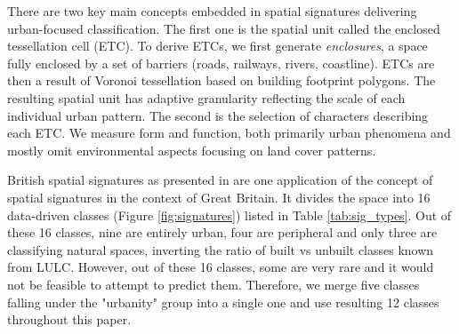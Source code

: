There are two key main concepts embedded in spatial signatures delivering urban-focused
classification. The first one is the spatial unit called the enclosed tessellation cell
(ETC). To derive ETCs, we first generate \textit{enclosures}, a space fully enclosed by
a set of barriers (roads, railways, rivers, coastline). ETCs are then a result of
Voronoi tessellation based on building footprint polygons. The resulting spatial unit
has adaptive granularity reflecting the scale of each individual urban pattern. The
second is the selection of characters describing each ETC. We measure form and function,
both primarily urban phenomena and mostly omit environmental aspects focusing on land
cover patterns.


British spatial signatures as presented in \cite{fleischmann2022geographical} are one
application of the concept of spatial signatures in
the context of Great Britain. It divides the space into 16 data-driven classes
(Figure \ref{fig:signatures}) listed in Table \ref{tab:sig_types}. Out of these 16
classes, nine are entirely urban, four are peripheral and only three are
classifying natural spaces,
inverting the ratio of built vs unbuilt classes known from LULC. However, out
of these 16 classes, some are very rare and it would not be feasible to attempt to
predict them. Therefore, we merge five classes falling under the "urbanity" group into a
single one and use resulting 12 classes throughout this paper.


